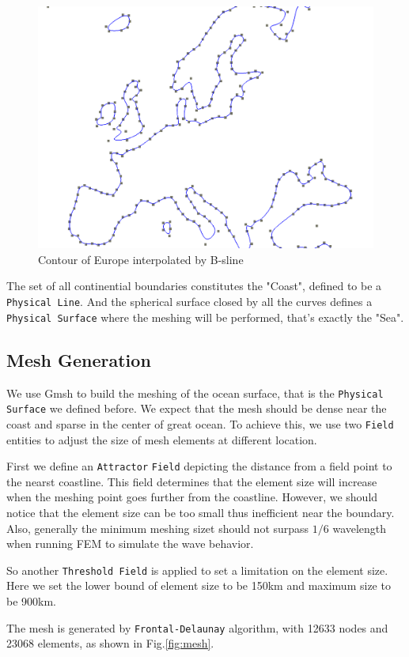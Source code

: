 \documentclass[a4paper]{article}
\begin{document}
\begin{figure}[H]
    \includegraphics[width=0.7\linewidth]{./images/geometry.png}
    \centering
    \caption{Contour of Europe interpolated by B-sline}
    \label{fig:geometry}
\end{figure}

The set of all continential boundaries constitutes the "Coast", defined to be a \verb|Physical Line|. 
And the spherical surface closed by all the curves defines a \verb|Physical Surface| 
where the meshing will be performed, that's exactly the "Sea".

\subsection{Mesh Generation}
We use Gmsh to build the meshing of the ocean surface, that is the \verb|Physical Surface| we defined before. 
We expect that the mesh should be dense near the coast and sparse in the center of great ocean. 
To achieve this, we use two \verb|Field| entities to adjust the size of mesh elements at different location.

First we define an \verb|Attractor| \verb|Field| depicting the distance from a field point to the nearst
coastline. This field determines that the element size will increase when the meshing point goes further 
from the coastline.  However, we should notice that the element size can be too small thus inefficient near the boundary.
Also, generally the minimum meshing sizet should not surpass $1/6$ wavelength when running FEM to 
simulate the wave behavior.

So another \verb|Threshold Field| is applied to set a limitation on the element size.
Here we set the lower bound of element size to be 150km and maximum size to be 900km.

The mesh is generated by \verb|Frontal-Delaunay| algorithm, with 12633 nodes and 23068 elements, 
as shown in Fig.\ref{fig:mesh}.
\end{document}
